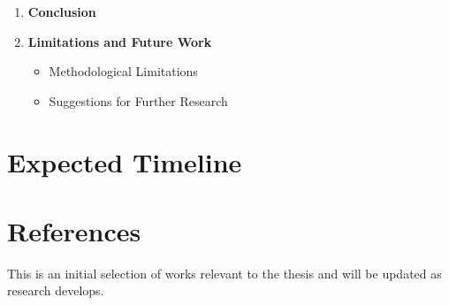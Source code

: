 \begin{enumerate}
  \item \textbf{Conclusion}

  \item \textbf{Limitations and Future Work}
    \begin{itemize}
      \item Methodological Limitations
      \item Suggestions for Further Research
    \end{itemize}
\end{enumerate}


\section{Expected Timeline}




 
\section{References}\label{sec:References}
This is an initial selection of works relevant to the thesis and will be updated as research develops.
\printbibliography[heading=none]

\begin{center}
\end{center}



